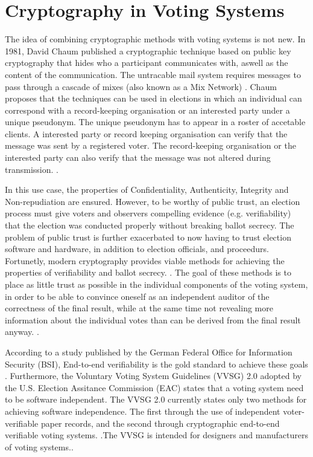 \section{Cryptography in Voting Systems}
The idea of combining cryptographic methods with voting systems is not new. In 1981, David Chaum published a cryptographic technique based on public key cryptography that hides who a participant communicates with, aswell as the content of the communication. The untracable mail system requires messages to pass through a cascade of mixes (also known as a Mix Network) \cite[86]{chaum}. Chaum proposes that the techniques can be used in elections in which an individual can correspond with a record-keeping organisation or an interested party under a unique pseudonym. The unique pseudonym has to appear in a roster of accetable clients. A interested party or record keeping organisation can verify that the message was sent by a registered voter. The record-keeping organisation or the interested party can also verify that the message was not altered during transmission. \cite[84]{chaum}. 

In this use case, the properties of Confidentiality, Authenticity, Integrity and Non-repudiation are ensured. However, to be worthy of public trust, an election process must give voters and observers compelling evidence (e.g. verifiability) that the election was conducted properly without breaking ballot secrecy. The problem of public trust is further exacerbated to now having to trust election software and hardware, in addition to election officials, and proceedurs. Fortunetly, modern cryptography provides viable methods for achieving the properties of verifiability and ballot secrecy. \cite[6]{onlinee-2e-study}. The goal of these methods is to place as little trust as possible in the individual components of the voting system, in order to be able to convince oneself as an independent auditor of the correctness of the final result, while at the same time not revealing more information about the individual votes than can be derived from the final result anyway. \cite[6, 10]{onlinee-2e-study}.

According to a study published by the German Federal Office for Information Security (BSI), End-to-end verifiability is the gold standard to achieve these goals \cite[10]{onlinee-2e-study}. Furthermore, the Voluntary Voting System Guidelines (VVSG) 2.0 adopted by the U.S. Election Assitance Commission (EAC) states that a voting system need to be software independent. The VVSG 2.0 currently states only two methods for achieving software independence. The first through the use of independent voter-verifiable paper records, and the second through cryptographic end-to-end verifiable voting systems. \cite[181]{vvsg}.The VVSG is intended for designers and manufacturers of voting systems.\cite{vvsg-intro}.


